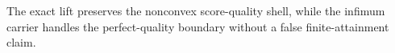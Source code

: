 The exact lift preserves the nonconvex score-quality shell, while the infimum carrier handles the perfect-quality boundary without a false finite-attainment claim.